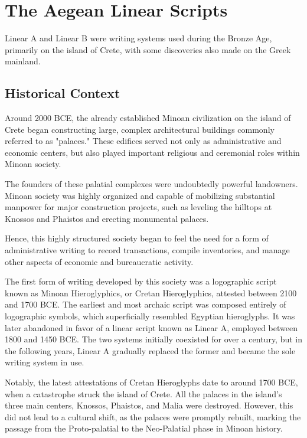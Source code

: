 \chapter{The Aegean Linear Scripts} \label{chap:history}
Linear A and Linear B were writing systems used during the Bronze Age, primarily on the island of Crete, with some discoveries also made on the Greek mainland.

\section{Historical Context}
Around 2000 BCE, the already established Minoan civilization on the island of Crete began constructing large, complex architectural buildings commonly referred to as "palaces."
These edifices served not only as administrative and economic centers, but also played important religious and ceremonial roles within Minoan society.

The founders of these palatial complexes were undoubtedly powerful landowners.
Minoan society was highly organized and capable of mobilizing substantial manpower for major construction projects, such as leveling the hilltops at Knossos and Phaistos and erecting monumental palaces. \cite{alexiou-ch2}

Hence, this highly structured society began to feel the need for a form of administrative writing to record transactions, compile inventories, and manage other aspects of economic and bureaucratic activity.

The first form of writing developed by this society was a logographic script known as Minoan Hieroglyphics, or Cretan Hieroglyphics, attested between 2100 and 1700 BCE.
The earliest and most archaic script was composed entirely of logographic symbols, which superficially resembled Egyptian hieroglyphs.
It was later abandoned in favor of a linear script known as Linear A, employed between 1800 and 1450 BCE.
The two systems initially coexisted for over a century, but in the following years, Linear A gradually replaced the former and became the sole writing system in use. \cite{salg-ch1}

Notably, the latest attestations of Cretan Hieroglyphs date to around 1700 BCE, when a catastrophe struck the island of Crete.
All the palaces in the island's three main centers, Knossos, Phaistos, and Malia were destroyed.
However, this did not lead to a cultural shift, as the palaces were promptly rebuilt, marking the passage from the Proto-palatial to the Neo-Palatial phase in Minoan history. \cite{alexiou-ch3}


